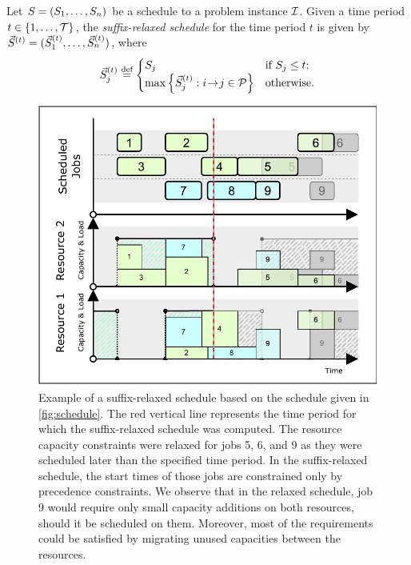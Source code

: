 \begin{defn} \label{def:suffix-relaxed-schedule}
    Let $S = (S_{1}, \dots, S_{n})$ be a schedule to a problem instance $\mathcal{I}$.
    Given a time period $t \in \{{1}, \dots, {\mathcal{T}}\}$,
    the \emph{suffix-relaxed schedule} for the time period $t$ is given by
    $\vec{S}^{(t)} = (\vec{S}^{(t)}_{1}, \dots, \vec{S}^{(t)}_{n})$, where
    $$
    \vec{S}^{(t)}_{j} \overset{\text{def}}{=} \begin{cases}
        S_{j} & \text{if $S_{j} \leq t$;} \\
        \max\left\{\vec{S}^{(t)}_{j} : i \hspace{-0.2em} \rightarrow \hspace{-0.2em} j \in \mathcal{P} \right\} & \text{otherwise.}
    \end{cases}
    $$
\end{defn}

\begin{figure}
    \centering
    \includegraphics[width=\textwidth]{img/Schedule-Relaxed.pdf}
    \caption{
        Example of a suffix-relaxed schedule based on the schedule given in \cref{fig:schedule}.
        The red vertical line represents the time period for which the suffix-relaxed schedule was computed.
        The resource capacity constraints were relaxed for jobs 5, 6, and 9
        as they were scheduled later than the specified time period.
        In the suffix-relaxed schedule,
        the start times of those jobs are constrained only by precedence constraints.
        We observe that in the relaxed schedule,
        job 9 would require only small capacity additions on both resources,
        should it be scheduled on them.
        Moreover, most of the requirements could be satisfied
        by migrating unused capacities between the resources.
        }
    \label{fig:schedule-relaxed}
\end{figure}

